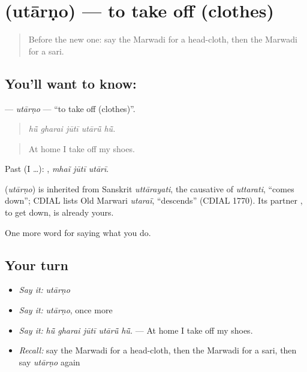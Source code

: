 \section[\texorpdfstring{\mw{उतारणो} (utārṇo)}{उतारणो (utārṇo)}]{ (utārṇo) — to take off (clothes)}

\label{lesson:MW-C174-utaarno}



\begin{quote}
Before the new one: say the Marwadi for a head-cloth, then the Marwadi for a sari.
\end{quote}

\subsection*{You'll want to know: }
\textbf{} — \emph{utārṇo} — \textquotedblleft{}to take off (clothes)\textquotedblright{}.

\begin{quote}
    
\end{quote}

\begin{quote}
\emph{hū̃ gharai jūtī utārū̃ hū̃.}
\end{quote}

\begin{quote}
At home I take off my shoes.
\end{quote}

Past (I …):   , \emph{mhaĩ jūtī utārī}.

\begin{cousinweb}
\textbf{} (\emph{utārṇo}) is inherited from Sanskrit \emph{uttārayati}, the causative of \emph{uttarati}, \textquotedblleft{}comes down\textquotedblright{}; CDIAL lists Old Marwari \emph{utaraï}, \textquotedblleft{}descends\textquotedblright{} (CDIAL 1770). Its partner \textbf{}, to get down, is already yours.
\end{cousinweb}

\begin{grammarlens}[title={What you've built}]
One more word for saying what you do.
\end{grammarlens}

\subsection*{Your turn}
\begin{itemize}
\raggedright
  \item \emph{Say it:} \emph{utārṇo}
  \item \emph{Say it:} \emph{utārṇo}, once more
  \item \emph{Say it:} \emph{hū̃ gharai jūtī utārū̃ hū̃.} — At home I take off my shoes.
  \item \emph{Recall:} say the Marwadi for a head-cloth, then the Marwadi for a sari, then say \emph{utārṇo} again
\end{itemize}

